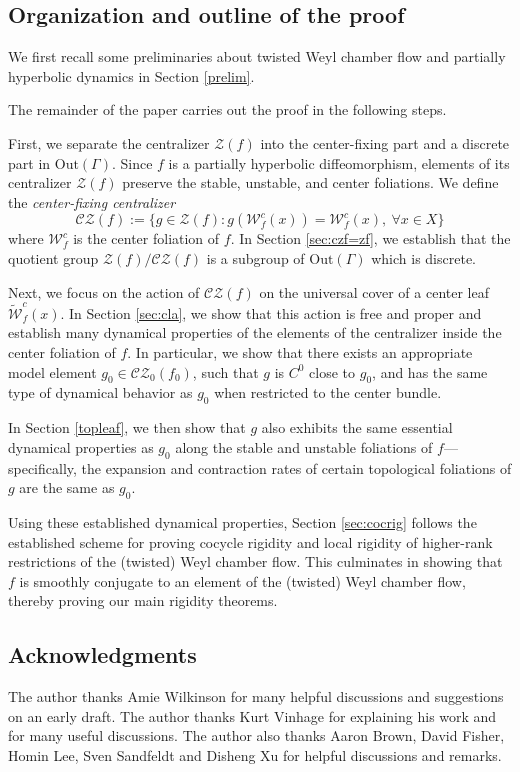 \documentclass[11pt]{amsart}
\numberwithin{equation}{section}
\newcommand{\W}{\mathcal{W}}
\newcommand{\CZ}{\mathcal{CZ}}
\theoremstyle{plain}
\begin{document}
\subsection{Organization and outline of the proof}\label{outl}

We first recall some preliminaries about twisted Weyl chamber flow and partially hyperbolic dynamics in Section \ref{prelim}.

The remainder of the paper carries out the proof in the following steps.

First, we separate the centralizer $\mathcal Z(f)$ into the center-fixing part and a discrete part in $\mathrm{Out}(\Gamma)$. Since \(f\) is a partially hyperbolic diffeomorphism, elements of its centralizer \(\mathcal{Z}(f)\) preserve the stable, unstable, and center foliations. We define the \emph{center-fixing centralizer}
\[\mathcal{CZ}(f) := \{ g \in \mathcal{Z}(f) : g(\mathcal{W}^c_f(x)) = \mathcal{W}^c_f(x),\ \forall x \in X \}\] where $\W^c_f$ is the center foliation of $f$. In Section \ref{sec:czf=zf}, we establish that the quotient group \(\mathcal{Z}(f)/\CZ(f)\) is a subgroup of \(\mathrm{Out}(\Gamma)\) which is discrete. 

Next, we focus on the action of \(\mathcal{CZ}(f)\) on the universal cover of a center leaf \(\tilde{\mathcal{W}}^c_f(x)\). In Section \ref{sec:cla}, we show that this action is free and proper and establish many dynamical properties of the elements of the centralizer inside the center foliation of $f$. In particular, we show that there exists an appropriate model element $g_0\in \CZ_0(f_0)$, such that $g$ is $C^0$ close to $g_0$, and has the same type of dynamical behavior as $g_0$ when restricted to the center bundle.

 In Section \ref{topleaf}, we then show that \(g\) also exhibits the same essential dynamical properties as $g_0$ along the stable and unstable foliations of $f$—specifically, the expansion and contraction rates of certain topological foliations of $g$ are the same as $g_0$. 

Using these established dynamical properties, Section \ref{sec:cocrig} follows the established scheme for proving cocycle rigidity and local rigidity of higher-rank restrictions of the (twisted) Weyl chamber flow. This culminates in showing that \(f\) is smoothly conjugate to an element of the (twisted) Weyl chamber flow, thereby proving our main rigidity theorems.


\subsection{Acknowledgments}
The author thanks Amie Wilkinson for many helpful discussions and suggestions on an early draft. The author thanks Kurt Vinhage for explaining his work and for many useful discussions. The author also thanks Aaron Brown, David Fisher, Homin Lee, Sven Sandfeldt and Disheng Xu for helpful discussions and remarks.
\end{document}
